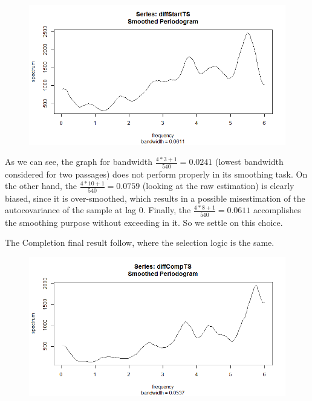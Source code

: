 \documentclass[12pt]{article} %
\begin{document}
\begin{figure}[h!]
\begin{center}
\includegraphics[scale=0.5]{spec88}
\caption{}
\end{center}
\end{figure}

As we can see, the graph for bandwidth $\frac{4*3+1}{540}=0.0241$ (lowest bandwidth considered for two passages) does not perform properly in its smoothing task. On the other hand, the $\frac{4*10+1}{540}=0.0759$ (looking at the raw estimation) is clearly biased, since it is over-smoothed, which results in a possible misestimation of the autocovariance of the sample at lag 0. Finally, the $\frac{4*8+1}{540}=0.0611$ accomplishes the smoothing purpose without exceeding in it. So we settle on this choice.

The Completion final result follow, where the selection logic is the same.
 
\begin{figure}[H]
\begin{center}
\includegraphics[scale=0.5]{spec77}
\caption{}
\end{center}
\end{figure}
\end{document}
